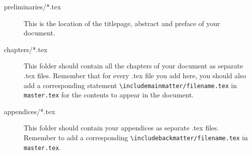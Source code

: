 \begin{description}
\item[preliminaries/*.tex]
	This is the location of the titlepage, abstract and preface of your document.

\item[chapters/*.tex]
	This folder should contain all the chapters of your document as separate .tex files.
	Remember that for every .tex file you add here, you should also add a corresponding
	statement \texttt{\textbackslash include{mainmatter/filename.tex}} in \texttt{master.tex} for the contents to appear
	in the document.

\item[appendices/*.tex]
	This folder should contain your appendices as separate .tex files. Remember to add
	a corresponding \texttt{\textbackslash include{backmatter/filename.tex}} in \texttt{master.tex}.

\end{description}
